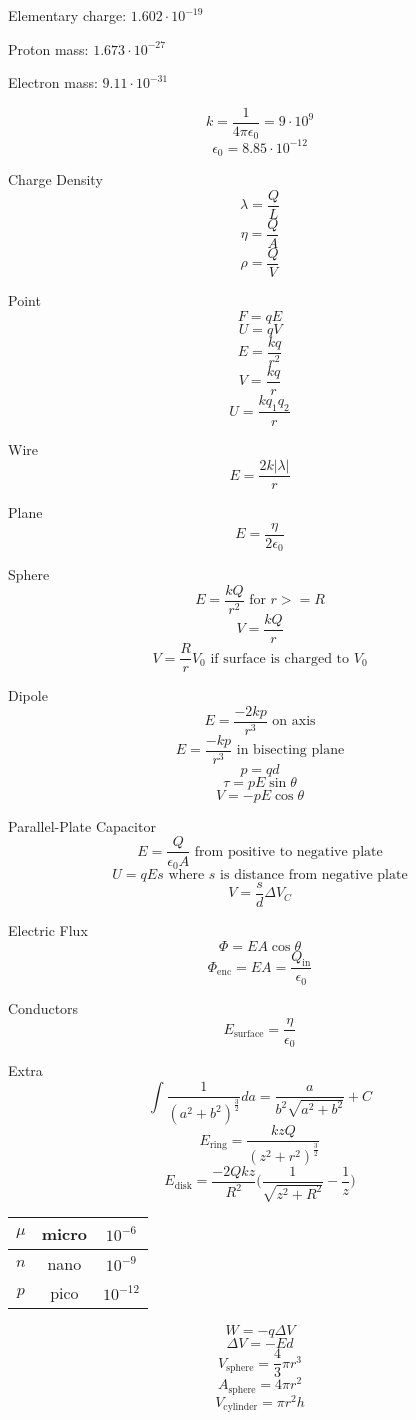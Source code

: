 \documentclass[twocolumn]{article}
\begin{document}
Elementary charge: $1.602\cdot 10^{-19}$

Proton mass: $1.673\cdot 10^{-27}$

Electron mass: $9.11\cdot 10^{-31}$

\[k=\frac{1}{4\pi\epsilon_0}=9\cdot 10^9\]
\[\epsilon_0=8.85\cdot 10^{-12}\]

Charge Density
\[\lambda = \frac{Q}{L}\]
\[\eta = \frac{Q}{A}\]
\[\rho = \frac{Q}{V}\]

Point
\[F=qE\]
\[U=qV\]
\[E=\frac{kq}{r^2}\]
\[V=\frac{kq}{r}\]
\[U=\frac{kq_1q_2}{r}\]

Wire
\[E=\frac{2k|\lambda |}{r}\]

Plane
\[E=\frac{\eta}{2\epsilon_0}\]

Sphere
\[E=\frac{kQ}{r^2}\text{ for }r >= R\]
\[V=\frac{kQ}{r}\]
\[V=\frac{R}{r}V_0\text{ if surface is charged to }V_0\]

Dipole
\[E=\frac{-2kp}{r^3}\text{ on axis}\]
\[E=\frac{-kp}{r^3}\text{ in bisecting plane}\]
\[p=qd\]
\[\tau =pE\sin\theta\]
\[V=-pE\cos\theta\]

Parallel-Plate Capacitor
\[E=\frac{Q}{\epsilon_0 A}\text{ from positive to negative plate}\]
\[U=qEs\text{ where $s$ is distance from negative plate}\]
\[V=\frac{s}{d}\Delta V_C\]

Electric Flux
\[\Phi = EA\cos\theta\]
\[\Phi_\text{enc}=EA=\frac{Q_\text{in}}{\epsilon_0}\]

Conductors
\[E_\text{surface}=\frac{\eta}{\epsilon_0}\]

Extra
\[\int \frac{1}{(a^2+b^2)^\frac{3}{2}}da=\frac{a}{b^2 \sqrt{a^2+b^2}}+C\]
\[E_\text{ring}=\frac{kzQ}{(z^2+r^2)^\frac{3}{2}}\]
\[E_\text{disk}=\frac{-2Qkz}{R^2}\Big(\frac{1}{\sqrt{z^2+R^2}}-\frac{1}{z}\Big)\]

\begin{tabular}{|c|c|c|} 
    \hline
    $\mu$ & micro & $10^{-6}$ \\
    \hline
    $n$ & nano & $10^{-9}$ \\
    \hline
    $p$ & pico & $10^{-12}$ \\
    \hline
\end{tabular}
\[W=-q\Delta V\]
\[\Delta V=-Ed\]
\[V_\text{sphere}=\frac{4}{3}\pi r^3\]
\[A_\text{sphere}=4\pi r^2\]
\[V_\text{cylinder}=\pi r^2 h\]
\end{document}
